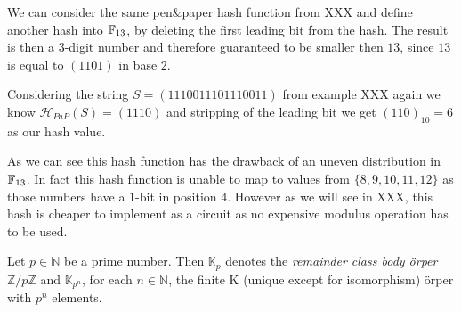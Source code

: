 \begin{example}We can consider the same pen\&paper hash function from XXX and define another hash into $\mathbb{F}_{13}$, by deleting the first leading bit from the hash. The result is then a $3$-digit number and therefore guaranteed to be smaller then $13$, since $13$ is equal to $(1101)$ in base $2$.  

Considering the string $S=(1110011101110011)$ from example XXX again we know $\mathcal{H}_{PaP}(S)=(1110)$ and stripping of the leading bit we get $(110)_{10}=6$ as our hash value.  

As we can see this hash function has the drawback of an uneven distribution in $\mathbb{F}_{13}$. In fact this hash function is unable to map to values from $\{8,9,10,11,12\}$ as those numbers have a $1$-bit in position $4$. However as we will see in XXX, this hash is cheaper to implement as a circuit as no expensive modulus operation has to be used.
\end{example}

\begin{definition} Let $ p \in \mathbb{N} $ be a prime number. Then $ \mathbb{K} _p $ denotes the \textit{remainder class body \"orper} $ \mathbb{ Z} / p \mathbb{Z} $ and $ \mathbb{K} _{p ^ n} $, for each $ n \in \mathbb{N} $, the finite K (unique except for isomorphism) \"orper with $ p ^ n $ elements.
\end{definition} 

